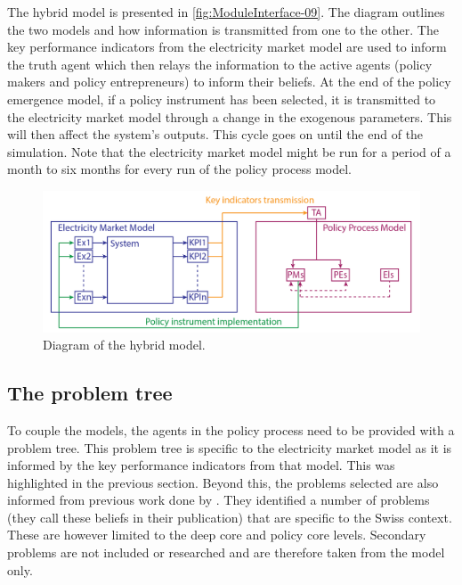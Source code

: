 The hybrid model is presented in \autoref{fig:ModuleInterface-09}. The diagram outlines the two models and how information is transmitted from one to the other. The key performance indicators from the electricity market model are used to inform the truth agent which then relays the information to the active agents (policy makers and policy entrepreneurs) to inform their beliefs. At the end of the policy emergence model, if a policy instrument has been selected, it is transmitted to the electricity market model through a change in the exogenous parameters. This will then affect the system's outputs. This cycle goes on until the end of the simulation. Note that the electricity market model might be run for a period of a month to six months for every run of the policy process model.

\begin{figure}
\centering
\includegraphics[width=\linewidth, keepaspectratio]{figures/ModuleInterface-09}
\caption{Diagram of the hybrid model.}
\label{fig:ModuleInterface-09}
\end{figure}


\subsection{The problem tree}
\label{ssec:interfaceProblemTree}

To couple the models, the agents in the policy process need to be provided with a problem tree. This problem tree is specific to the electricity market model as it is informed by the key performance indicators from that model. This was highlighted in the previous section. Beyond this, the problems selected are also informed from previous work done by \cite{markard2016socio}. They identified a number of problems (they call these beliefs in their publication) that are specific to the Swiss context. These are however limited to the deep core and policy core levels. Secondary problems are not included or researched and are therefore taken from the model only.

